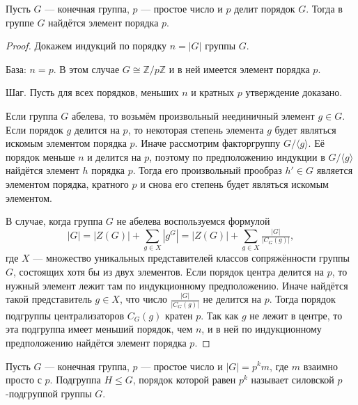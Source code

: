 
\begin{theorem}[Коши] \label{Cauchy}
	Пусть $ G $ --- конечная группа, $ p $ --- простое число и $ p $ делит порядок $ G $. 
	Тогда в группе $ G $ найдётся элемент порядка $ p $.
\end{theorem}

\begin{proof}
	\hfill
	
	Докажем индукций по порядку $ n = |G| $ группы $ G $.
	
	База: $ n = p $. В этом случае $ G \cong \mathbb{Z}/p\mathbb{Z} $ и в ней имеется элемент порядка $ p $.
	
	Шаг. Пусть для всех порядков, меньших $ n $ и кратных $ p $ утверждение доказано.
	
	Если группа $ G $ абелева, то возьмём произвольный неединичный элемент $ g \in G $.
	Если порядок $ g $ делится на $ p $, то некоторая степень элемента $ g $ 
	будет являться искомым элементом порядка $ p $.
	Иначе рассмотрим факторгруппу $ G/\langle g \rangle $. Её порядок меньше $ n $ и делится на $ p $,
	поэтому по предположению индукции в $ G/\langle g \rangle $ найдётся элемент $ h $ порядка $ p $.
	Тогда его произвольный прообраз $ h' \in G $ является элементом порядка, кратного $ p $
	и снова его степень будет являться искомым элементом.
	
	В случае, когда группа $ G $ не абелева воспользуемся формулой
	$$ |G| = |Z(G)| + \sum\limits_{g \in X} |g^G| = |Z(G)| + \sum\limits_{g \in X} \tfrac{|G|}{|C_G(g)|}, $$
	где $ X $ --- множество уникальных представителей классов сопряжённости группы $ G $, состоящих хотя бы из двух элементов.
	Если порядок центра делится на $ p $, то нужный элемент лежит там по индукционному предположению.
	Иначе найдётся такой представитель $ g \in X $, что число $ \tfrac{|G|}{|C_G(g)|} $ не делится на $ p $.
	Тогда порядок подгруппы централизаторов $ C_G(g) $ кратен $ p $. Так как $ g $ не лежит в центре, 
	то эта подгруппа имеет меньший порядок, чем $ n $, и в ней по индукционному предположению найдётся
	элемент порядка $ p $.
\end{proof}

Пусть $ G $ --- конечная группа, $ p $ --- простое число и $ |G| = p^km $, где $ m $ взаимно просто с $ p $.
Подгруппа $ H \leqslant G $, порядок которой равен $ p^k $ называет \textcolor{defcolor}{силовской $ p $-подгруппой} группы $ G $.


